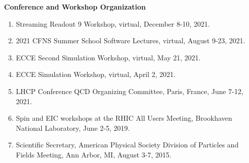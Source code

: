 \documentclass[11pt]{article}
\begin{document}
\vspace{7pt}
\begin{flushleft}
	\LARGE\textbf{Conference and Workshop Organization} \\
	\normalsize 
	\begin{enumerate}
	
		\item Streaming Readout 9 Workshop, virtual, December 8-10, 2021.
		\item 2021 CFNS Summer School Software Lectures, virtual, August 9-23, 2021.
		\item ECCE Second Simulation Workshop, virtual, May 21, 2021.
		\item ECCE Simulation Workshop, virtual, April 2, 2021.
		\item LHCP Conference QCD Organizing Committee, Paris, France, June 7-12, 2021.
		\item Spin and EIC workshops at the RHIC All Users Meeting, Brookhaven National Laboratory, June 2-5, 2019.
		\item Scientific Secretary, American Physical Society Division of Particles and Fields Meeting, Ann Arbor, MI, August 3-7, 2015.
	\end{enumerate}
\end{flushleft}

\vspace{7pt}



\end{document}
